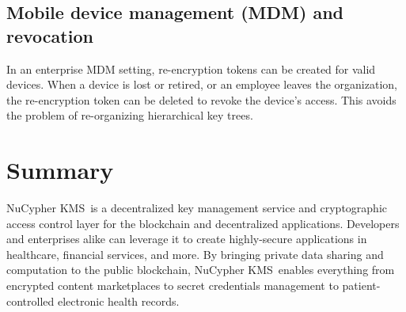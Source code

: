 \documentclass[notitlepage,longbibliography]{revtex4-1}
\newcommand{\kms}{NuCypher KMS}
\begin{document}
\subsection{Mobile device management (MDM) and revocation}
In an enterprise MDM setting, re-encryption tokens can be created for valid devices. When a device is lost or retired,
or an employee leaves the organization, the re-encryption token can be deleted to revoke the device's access. This avoids the
problem of re-organizing hierarchical key trees.

\section{Summary}
\kms~is a decentralized key management service and cryptographic access control layer for the blockchain and
decentralized applications.
Developers and enterprises alike can leverage it to create highly-secure applications in healthcare,
financial services, and more.
By bringing private data sharing and computation to the public blockchain, \kms~enables everything from encrypted
content marketplaces to secret credentials management to patient-controlled electronic health records. 


\end{document}
